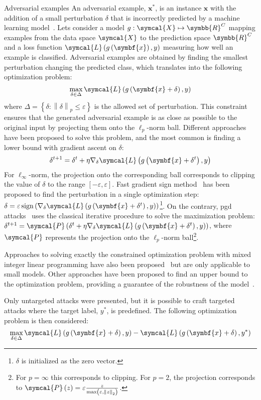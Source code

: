 \documentclass[../main.tex]{subfiles}
\begin{document}
	\begin{mybox}[label={box:adversarial}]{Adversarial examples}
	    An adversarial example, \(\symbf{x}^{\ast}\), is an instance \(\symbf{x}\) with the addition of a small perturbation \(\delta\) that is incorrectly predicted by a machine learning model~\cite{Szegedy2013IntriguingPO}.
	    Lets consider a model \(g:\symcal{X} \mapsto \symbb{R}^{C} \) mapping examples from the data space \(\symcal{X}\) to the prediction space \(\symbb{R}^{C}\) and a loss function \(\symcal{L}\left(g\left(\symbf{x}\right), y \right)\) measuring how well an example is classified.
	    Adversarial examples are obtained by finding the smallest perturbation changing the predicted class, which translates into the following optimization problem:
	    \[\max_{\delta \in \Delta} \symcal{L}\left(g\left(\symbf{x}+\delta\right), y \right)\]
	    where \(\Delta = \left\{\delta: \left\|\delta\right\|_{p} \leq \varepsilon \right\}\) is the allowed set of perturbation.
	    This constraint ensures that the generated adversarial example is as close as possible to the original input by projecting them onto the \(\ell_{p}\)-norm ball.
	    Different approaches have been proposed to solve this problem, and the most common is finding a lower bound with gradient ascent on \(\delta\):
	    \[\delta^{t+1} = \delta^{t} + \eta \nabla_{\delta}\symcal{L}\left(g\left(\symbf{x}+\delta^{t}\right), y \right)\]
	    For \(\ell_{\infty}\)-norm, the projection onto the corresponding ball corresponds to clipping the value of \(\delta\) to the range \(\left[-\varepsilon, \varepsilon\right]\).
	    Fast gradient sign method~\cite{FGSM} has been proposed to find the perturbation in a single optimization step: \(\delta = \varepsilon \operatorname{sign}\left(\nabla_{\delta}\symcal{L}\left(g\left(\symbf{x}+\delta^{t}\right), y \right)\right)\)\footnote{\(\delta\) is initialized as the zero vector.}.
	    On the contrary, \gls{pgd} attacks~\cite{PGDAttacks,PGDAttacks2} uses the classical iterative procedure to solve the maximization problem: \(\delta^{t+1} = \symcal{P}\left(\delta^{t} + \eta \nabla_{\delta}\symcal{L}\left(g\left(\symbf{x}+\delta^{t}\right), y \right)\right)\), where \(\symcal{P}\) represents the projection onto the \(\ell_{p}\)-norm ball\footnote{For \(p = \infty\) this corresponds to clipping. For \(p =2\), the projection corresponds to \(\symcal{P}\left(z\right) = \varepsilon \frac{z}{\max\left(\varepsilon, \left\|z\right\|_{2}\right)}\).}.

	    Approaches to solving exactly the constrained optimization problem with mixed integer linear programming have also been proposed~\cite{tjeng2018evaluating} but are only applicable to small models.
	    Other approaches have been proposed to find an upper bound to the optimization problem, providing a guarantee of the robustness of the model~\cite{pmlr-v80-wong18a}.

	    Only untargeted attacks were presented, but it is possible to craft targeted attacks where the target label, \(y^{\ast}\), is predefined.
	    The following optimization problem is then considered:
	    \[\max_{\delta \in \Delta} \symcal{L}\left(g\left(\symbf{x}+\delta\right), y \right) - \symcal{L}\left(g\left(\symbf{x}+\delta\right), y^{\ast} \right)\]
	\end{mybox}
\end{document}
